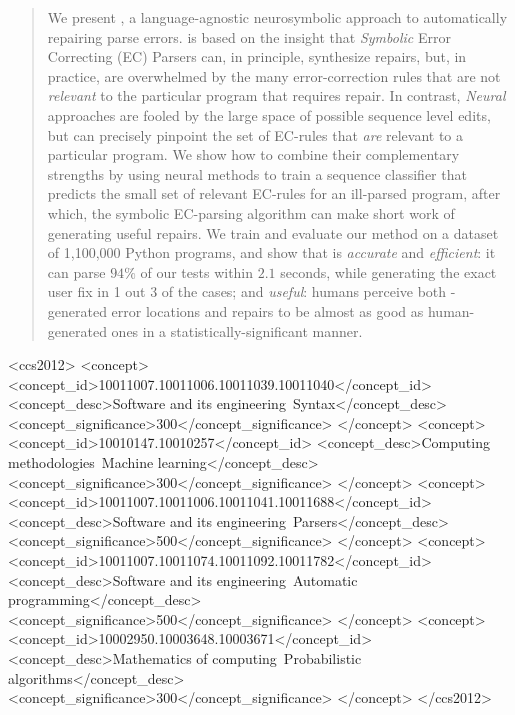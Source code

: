 \documentclass[acmsmall,screen]{acmart}
\begin{document}
\begin{abstract}
We present \toolname, a language-agnostic neurosymbolic approach to
automatically repairing parse errors.
%
\toolname is based on the insight that
%
\emph{Symbolic} Error Correcting (EC) Parsers can, in principle,
synthesize repairs, but, in practice, are overwhelmed by
the many error-correction rules that are not \emph{relevant}
to the particular program that requires repair.
%
In contrast, \emph{Neural} approaches are fooled by the large
space of possible sequence level edits, but can precisely
pinpoint the set of EC-rules that \emph{are} relevant
to a particular program.
%
We show how to combine their complementary strengths
by using neural methods to train a sequence classifier
that predicts the small set of relevant EC-rules
for an ill-parsed program, after which, the symbolic
EC-parsing algorithm can make short work of generating
useful repairs.
%
We train and evaluate our method on a dataset of 1,100,000
Python programs, and show that \toolname is
%
\emph{accurate} and \emph{efficient}: it can parse $94\%$
of our tests within $2.1$ seconds, while generating the
exact user fix in 1 out 3 of the cases; and
%
\emph{useful}: humans perceive both \toolname-generated error locations and
repairs to be almost as good as human-generated ones in a
statistically-significant manner.
\end{abstract}


\begin{CCSXML}
  <ccs2012>
    <concept>
        <concept_id>10011007.10011006.10011039.10011040</concept_id>
        <concept_desc>Software and its engineering~Syntax</concept_desc>
        <concept_significance>300</concept_significance>
        </concept>
    <concept>
        <concept_id>10010147.10010257</concept_id>
        <concept_desc>Computing methodologies~Machine learning</concept_desc>
        <concept_significance>300</concept_significance>
        </concept>
    <concept>
        <concept_id>10011007.10011006.10011041.10011688</concept_id>
        <concept_desc>Software and its engineering~Parsers</concept_desc>
        <concept_significance>500</concept_significance>
        </concept>
    <concept>
        <concept_id>10011007.10011074.10011092.10011782</concept_id>
        <concept_desc>Software and its engineering~Automatic programming</concept_desc>
        <concept_significance>500</concept_significance>
        </concept>
    <concept>
        <concept_id>10002950.10003648.10003671</concept_id>
        <concept_desc>Mathematics of computing~Probabilistic algorithms</concept_desc>
        <concept_significance>300</concept_significance>
        </concept>
  </ccs2012>
\end{CCSXML}
\end{document}
